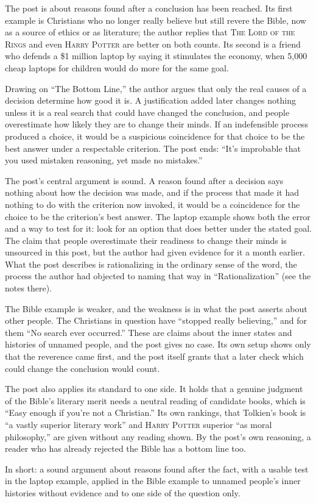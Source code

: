 \begin{afterword}
\summaryhead

The post is about reasons found after a conclusion has been reached. Its first example is Christians who no longer really believe but still revere the Bible, now as a source of ethics or as literature; the author replies that \textsc{The Lord of the Rings} and even \textsc{Harry Potter} are better on both counts. Its second is a friend who defends a \$1 million laptop by saying it stimulates the economy, when 5,000 cheap laptops for children would do more for the same goal.

Drawing on ``The Bottom Line,'' the author argues that only the real causes of a decision determine how good it is. A justification added later changes nothing unless it is a real search that could have changed the conclusion, and people overestimate how likely they are to change their minds. If an indefensible process produced a choice, it would be a suspicious coincidence for that choice to be the best answer under a respectable criterion. The post ends: ``It's improbable that you used mistaken reasoning, yet made no mistakes.''

\responsehead

The post's central argument is sound. A reason found after a decision says nothing about how the decision was made, and if the process that made it had nothing to do with the criterion now invoked, it would be a coincidence for the choice to be the criterion's best answer. The laptop example shows both the error and a way to test for it: look for an option that does better under the stated goal. The claim that people overestimate their readiness to change their minds is unsourced in this post, but the author had given evidence for it a month earlier. What the post describes is rationalizing in the ordinary sense of the word, the process the author had objected to naming that way in ``Rationalization'' (see the notes there).

The Bible example is weaker, and the weakness is in what the post asserts about other people. The Christians in question have ``stopped really believing,'' and for them ``No search ever occurred.'' These are claims about the inner states and histories of unnamed people, and the post gives no case. Its own setup shows only that the reverence came first, and the post itself grants that a later check which could change the conclusion would count.

The post also applies its standard to one side. It holds that a genuine judgment of the Bible's literary merit needs a neutral reading of candidate books, which is ``Easy enough if you're not a Christian.'' Its own rankings, that Tolkien's book is ``a vastly superior literary work'' and \textsc{Harry Potter} superior ``as moral philosophy,'' are given without any reading shown. By the post's own reasoning, a reader who has already rejected the Bible has a bottom line too.

In short: a sound argument about reasons found after the fact, with a usable test in the laptop example, applied in the Bible example to unnamed people's inner histories without evidence and to one side of the question only.
\end{afterword}
